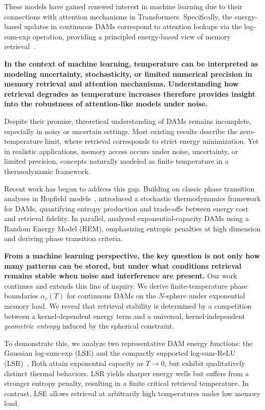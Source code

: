 \documentclass{article}
\theoremstyle{plain}
\theoremstyle{definition}
\theoremstyle{remark}
\begin{document}
These models have gained renewed interest in machine learning due to their connections with attention mechanisms in Transformers. Specifically, the energy-based updates in continuous DAMs correspond to attention lookups via the log-sum-exp operation, providing a principled energy-based view of memory retrieval~\citep{ramsauer2021hopfield}.

\textbf{In the context of machine learning, temperature can be interpreted as modeling uncertainty, stochasticity, or limited numerical precision in memory retrieval and attention mechanisms. Understanding how retrieval degrades as temperature increases therefore provides insight into the robustness of attention-like models under noise.}

Despite their promise, theoretical understanding of DAMs remains incomplete, especially in noisy or uncertain settings. Most existing results describe the zero-temperature limit, where retrieval corresponds to strict energy minimization. Yet in realistic applications, memory access occurs under noise, uncertainty, or limited precision, concepts naturally modeled as finite temperature in a thermodynamic framework.

Recent work has begun to address this gap. Building on classic phase transition analyses in Hopfield models~\citep{amit1987statistical}, \citet{rooke2026stochastic} introduced a stochastic thermodynamics framework for DAMs, quantifying entropy production and trade-offs between energy cost and retrieval fidelity. In parallel, \citet{lucibello2024exponential} analyzed exponential-capacity DAMs using a Random Energy Model (REM), emphasizing entropic penalties at high dimension and deriving phase transition criteria.

\textbf{From a machine learning perspective, the key question is not only how many patterns can be stored, but under what conditions retrieval remains stable when noise and interference are present.}
Our work continues and extends this line of inquiry. We derive finite-temperature phase boundaries $\alpha_c(T)$ for continuous DAMs on the $N$-sphere under exponential memory load. We reveal that retrieval stability is determined by a competition between a kernel-dependent energy term and a universal, kernel-independent \emph{geometric entropy} induced by the spherical constraint.

To demonstrate this, we analyze two representative DAM energy functions: the Gaussian log-sum-exp (LSE) and the compactly supported log-sum-ReLU (LSR)~\citep{hoover2025dense}. Both attain exponential capacity as $T \to 0$, but exhibit qualitatively distinct thermal behaviors. LSR yields sharper energy wells but suffers from a stronger entropy penalty, resulting in a finite critical retrieval temperature. In contrast, LSE allows retrieval at arbitrarily high temperatures under low memory load.
\end{document}

